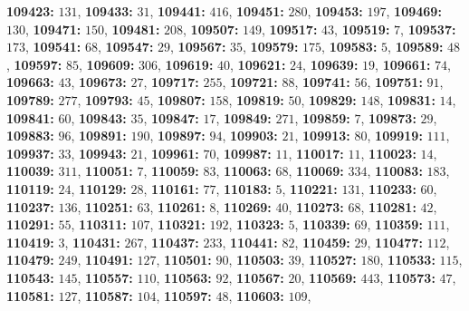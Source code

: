 \textsf{\bfseries 109423:} $131$, \textsf{\bfseries 109433:} $31$, \textsf{\bfseries 109441:} $416$, \textsf{\bfseries 109451:} $280$, \textsf{\bfseries 109453:} $197$, \textsf{\bfseries 109469:} $130$, \textsf{\bfseries 109471:} $150$, \textsf{\bfseries 109481:} $208$, \textsf{\bfseries 109507:} $149$, \textsf{\bfseries 109517:} $43$, \textsf{\bfseries 109519:} $7$, \textsf{\bfseries 109537:} $173$, \textsf{\bfseries 109541:} $68$, \textsf{\bfseries 109547:} $29$, \textsf{\bfseries 109567:} $35$, \textsf{\bfseries 109579:} $175$, \textsf{\bfseries 109583:} $5$, \textsf{\bfseries 109589:} $48$, \textsf{\bfseries 109597:} $85$, \textsf{\bfseries 109609:} $306$, \textsf{\bfseries 109619:} $40$, \textsf{\bfseries 109621:} $24$, \textsf{\bfseries 109639:} $19$, \textsf{\bfseries 109661:} $74$, \textsf{\bfseries 109663:} $43$, \textsf{\bfseries 109673:} $27$, \textsf{\bfseries 109717:} $255$, \textsf{\bfseries 109721:} $88$, \textsf{\bfseries 109741:} $56$, \textsf{\bfseries 109751:} $91$, \textsf{\bfseries 109789:} $277$, \textsf{\bfseries 109793:} $45$, \textsf{\bfseries 109807:} $158$, \textsf{\bfseries 109819:} $50$, \textsf{\bfseries 109829:} $148$, \textsf{\bfseries 109831:} $14$, \textsf{\bfseries 109841:} $60$, \textsf{\bfseries 109843:} $35$, \textsf{\bfseries 109847:} $17$, \textsf{\bfseries 109849:} $271$, \textsf{\bfseries 109859:} $7$, \textsf{\bfseries 109873:} $29$, \textsf{\bfseries 109883:} $96$, \textsf{\bfseries 109891:} $190$, \textsf{\bfseries 109897:} $94$, \textsf{\bfseries 109903:} $21$, \textsf{\bfseries 109913:} $80$, \textsf{\bfseries 109919:} $111$, \textsf{\bfseries 109937:} $33$, \textsf{\bfseries 109943:} $21$, \textsf{\bfseries 109961:} $70$, \textsf{\bfseries 109987:} $11$, \textsf{\bfseries 110017:} $11$, \textsf{\bfseries 110023:} $14$, \textsf{\bfseries 110039:} $311$, \textsf{\bfseries 110051:} $7$, \textsf{\bfseries 110059:} $83$, \textsf{\bfseries 110063:} $68$, \textsf{\bfseries 110069:} $334$, \textsf{\bfseries 110083:} $183$, \textsf{\bfseries 110119:} $24$, \textsf{\bfseries 110129:} $28$, \textsf{\bfseries 110161:} $77$, \textsf{\bfseries 110183:} $5$, \textsf{\bfseries 110221:} $131$, \textsf{\bfseries 110233:} $60$, \textsf{\bfseries 110237:} $136$, \textsf{\bfseries 110251:} $63$, \textsf{\bfseries 110261:} $8$, \textsf{\bfseries 110269:} $40$, \textsf{\bfseries 110273:} $68$, \textsf{\bfseries 110281:} $42$, \textsf{\bfseries 110291:} $55$, \textsf{\bfseries 110311:} $107$, \textsf{\bfseries 110321:} $192$, \textsf{\bfseries 110323:} $5$, \textsf{\bfseries 110339:} $69$, \textsf{\bfseries 110359:} $111$, \textsf{\bfseries 110419:} $3$, \textsf{\bfseries 110431:} $267$, \textsf{\bfseries 110437:} $233$, \textsf{\bfseries 110441:} $82$, \textsf{\bfseries 110459:} $29$, \textsf{\bfseries 110477:} $112$, \textsf{\bfseries 110479:} $249$, \textsf{\bfseries 110491:} $127$, \textsf{\bfseries 110501:} $90$, \textsf{\bfseries 110503:} $39$, \textsf{\bfseries 110527:} $180$, \textsf{\bfseries 110533:} $115$, \textsf{\bfseries 110543:} $145$, \textsf{\bfseries 110557:} $110$, \textsf{\bfseries 110563:} $92$, \textsf{\bfseries 110567:} $20$, \textsf{\bfseries 110569:} $443$, \textsf{\bfseries 110573:} $47$, \textsf{\bfseries 110581:} $127$, \textsf{\bfseries 110587:} $104$, \textsf{\bfseries 110597:} $48$, \textsf{\bfseries 110603:} $109$, 
